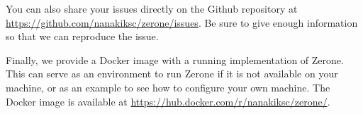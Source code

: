 \documentclass[12pt]{article}
\begin{document}
You can also share your issues directly on the Github repository
at \url{https://github.com/nanakiksc/zerone/issues}. Be sure to give
enough information so that we can reproduce the issue.

Finally, we provide a Docker image with a running implementation
of Zerone. This can serve as an environment to run Zerone if it
is not available on your machine, or as an example to see how to
configure your own machine. The Docker image is available at
\url{https://hub.docker.com/r/nanakiksc/zerone/}.
\end{document}
